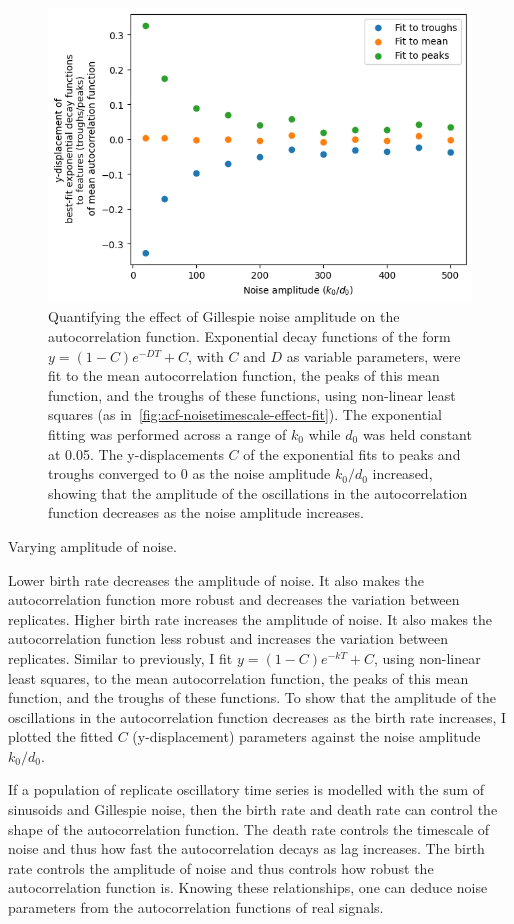 \begin{figure}
  \centering
  \includegraphics[width=0.45\linewidth]{birthrate_vs_ydispl.png}
  \caption{
    Quantifying the effect of Gillespie noise amplitude on the autocorrelation function.
    Exponential decay functions of the form $y = (1-C)e^{-DT}+C$, with $C$ and $D$ as variable parameters, were fit to the mean autocorrelation function, the peaks of this mean function, and the troughs of these functions, using non-linear least squares (as in~\ref{fig:acf-noisetimescale-effect-fit}).
    The exponential fitting was performed across a range of $k_{0}$ while $d_{0}$ was held constant at 0.05.
    The y-displacements $C$ of the exponential fits to peaks and troughs converged to 0 as the noise amplitude $k_{0}/d_{0}$ increased, showing that the amplitude of the oscillations in the autocorrelation function decreases as the noise amplitude increases.
  }
  \label{fig:acf-noiseamplitude-effect}
\end{figure}

Varying amplitude of noise.

Lower birth rate decreases the amplitude of noise.
It also makes the autocorrelation function more robust and decreases the variation between replicates.
Higher birth rate increases the amplitude of noise.
It also makes the autocorrelation function less robust and increases the variation between replicates.
Similar to previously, I fit \(y = (1-C)e^{-kT}+C\), using non-linear least squares, to the mean autocorrelation function, the peaks of this mean function, and the troughs of these functions.
To show that the amplitude of the oscillations in the autocorrelation function decreases as the birth rate increases, I plotted the fitted \(C\) (y-displacement) parameters against the noise amplitude \(k_{0}/d_{0}\).

If a population of replicate oscillatory time series is modelled with the sum of sinusoids and Gillespie noise, then the birth rate and death rate can control the shape of the autocorrelation function.  The death rate controls the timescale of noise and thus how fast the autocorrelation decays as lag increases.  The birth rate controls the amplitude of noise and thus controls how robust the autocorrelation function is.  Knowing these relationships, one can deduce noise parameters from the autocorrelation functions of real signals.


